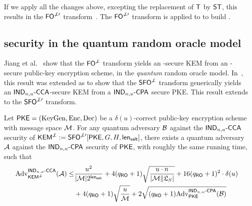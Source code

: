 If we apply all the changes above, excepting the replacement of $\T$ by $\ST$, this results in the $\FOnotperpprime$ transform~\cite{EuroSP:Kyber,NISTPQC-R3:FrodoKEM20}.
The $\FOnotperpprime$ transform is applied to \FrodoPKE to build \eFrodoKEM.


\subsection{\INDCCA security in the quantum random oracle model}
\label{sec:strength:cca-kem-qrom}

Jiang et al.~\cite{C:JZCWM18} show that the $\FOnotperp$ transform yields an \INDCCA-secure KEM from an \OWCPA-secure public-key encryption scheme, in the \emph{quantum} random oracle model.
In~\cite{GlabushThesis}, this result was extended as to show that the $\SFOnotperp$ transform generically yields an $\MINDCCA$-secure KEM from a $\MINDCPA$ secure PKE.
This result extends to the $\SFOnotperpprime$ transform.

\begin{theorem}
  Let $\PKE = (\KeyGen,\Enc,\Dec)$ be a $\delta(u)$-correct public-key
  encryption scheme with message space $\MsgSp$. For any quantum adversary $\Bdversary$ against the $\MINDCCA$ security of $\KEMnotperp := \SFOnotperpprime[\PKE, G, H, \lengthsalt]$, there exists a quantum adversary $\Adversary$ against the $\MINDCPA$ security of $\PKE$, with roughly the same running time, such that
  \begin{equation}\label{thm:cca-kem-to-cpa-pke-qrom}
    \begin{split}  
        \Adv{\MINDCCA}{\KEMnotperp}(\Adversary) \leq &\dfrac{u^2}{|\M|2^{\lengthsalt}} + 4(\qro + 1)\sqrt{\dfrac{u\cdot n}{|\M\|\saltlist|}} + 16(\qro + 1)^2\cdot \delta(u)\\ & +
        4(\qro+1)\sqrt{\dfrac{u}{\M}} + 2\sqrt{(\qro + 1)\Adv{\MINDCPA}{\PKE}(\Bdversary)}
    \end{split}
  \end{equation}
\end{theorem}

